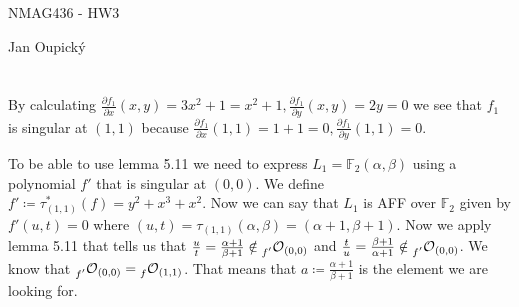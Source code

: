 \documentclass[12pt, a4paper]{article}
\begin{document}
\begin{center}
\large NMAG436 - HW3

\normalsize Jan Oupický
\end{center}
\vspace{1\baselineskip}

\section{}
By calculating $\frac{\partial f_1}{\partial x} (x,y) = 3x^2+1=x^2+1, \frac{\partial f_1}{\partial y} (x,y) = 2y=0$ we see that $f_1$ is singular at $(1,1)$ because $\frac{\partial f_1}{\partial x} (1,1)= 1+1=0, \frac{\partial f_1}{\partial y} (1,1)=0$.

To be able to use lemma 5.11 we need to express $L_1=\mathbb{F}_2(\alpha,\beta)$ using a polynomial $f'$ that is singular at $(0,0)$. We define $f'\coloneqq\tau_{(1,1)}^{*}(f) = y^2+x^3+x^2$. Now we can say that $L_1$ is AFF over $\mathbb{F}_2$ given by $f'(u,t)=0$ where $(u,t)=\tau_{(1,1)}(\alpha,\beta) = (\alpha+1,\beta+1)$. Now we apply lemma 5.11 that tells us that $\frac{u}{t}=\frac{\alpha+1}{\beta+1} \notin \prescript{}{f'}{\mathcal{O}}_{(0,0)}$ and $\frac{t}{u}=\frac{\beta+1}{\alpha+1} \notin \prescript{}{f'}{\mathcal{O}}_{(0,0)}$. We know that $\prescript{}{f'}{\mathcal{O}}_{(0,0)} = \prescript{}{f}{\mathcal{O}}_{(1,1)}$. That means that $a \coloneqq \frac{\alpha+1}{\beta+1}$ is the element we are looking for.
\end{document}
